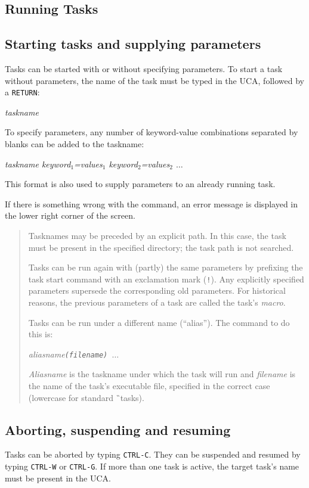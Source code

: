 \subsection{Running Tasks}
\subsection*{Starting tasks and supplying parameters} 
Tasks can be started with or without specifying parameters.
To start a task without parameters, the name of the task must be typed in the
UCA, followed by a {\tt RETURN}:

{\it taskname}

To specify parameters, any number of keyword-value combinations separated 
by blanks can be added to the taskname:

{\it taskname 
keyword\/${}_1$=values\/${}_1$ 
keyword\/${}_2$=values\/${}_2$ $\ldots$}

This format is also used to supply parameters to an already running task.

If there is something wrong with the command, an error message is displayed
in the lower right corner of the screen.

\begin{quote}
\small
Tasknames may be preceded by an explicit path. In this case, the task must
be present in the specified directory; the task path is not searched.

Tasks can be run again with (partly) the same parameters by prefixing the
task start command with an exclamation mark ({\tt !}). 
Any explicitly specified parameters supersede the corresponding old parameters.
For historical reasons, the previous parameters of a task are called the
task's {\em macro\/}.

Tasks can be run under a different name (``alias''). The command to do this is:

{\it aliasname\tt (\it filename\tt ) $\ldots$}

{\it Aliasname} is the taskname under which the task will run and
{\it filename\/} is the name of the task's executable file, specified in the
correct case (lowercase for standard \G\ tasks).
\end{quote}
\subsection*{Aborting, suspending and resuming}
Tasks can be aborted by typing {\tt CTRL-C}.
They can be suspended and resumed by typing {\tt CTRL-W} or {\tt CTRL-G}.
If more than one task is active, the target task's name must be present in
the UCA.

